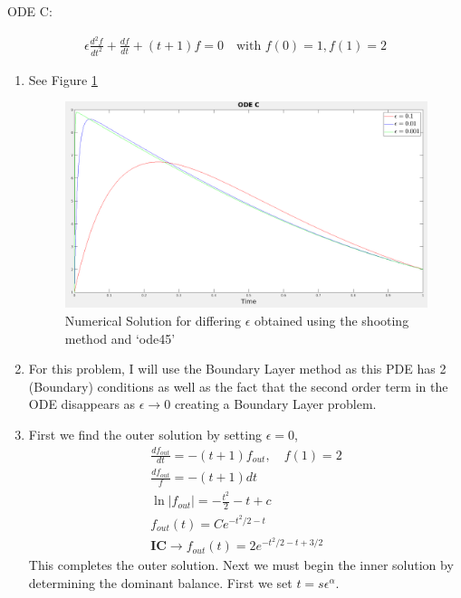 \documentclass{article}
\begin{document}
\vspace{20pt}

ODE C: 

\begin{gather*}
    \epsilon\frac{d^2f}{dt^2} + \frac{df}{dt} + (t+1)f = 0 \quad
    \text{with } f(0) = 1, f(1) = 2
\end{gather*}

\begin{enumerate}[label=\alph*.]
    \item See Figure \ref{fig:ODEC_num_sol}
        \begin{figure}[ht]
            \centering
            \includegraphics[width=.8\textwidth]{images/ODEC.png}
            \caption{Numerical Solution for differing $\epsilon$ obtained using
            the shooting method and `ode45'}
            \label{fig:ODEC_num_sol}
        \end{figure}
    \item For this problem, I will use the Boundary Layer method as this PDE has
    2 (Boundary) conditions as well as the fact that the second order term in
    the ODE disappears as $\epsilon \to 0$ creating a Boundary Layer problem.
    \item First we find the outer solution by setting $\epsilon = 0$, 
    \begin{gather*}
        \frac{df_{out}}{dt} = - (t+1)f_{out}, \quad f(1) = 2\\
        \frac{df_{out}}{f} = - (t+1)dt\\
        \ln|f_{out}| = -\frac{t^2}{2} - t + c\\
        f_{out}(t) = Ce^{-t^2/2 - t}\\
        \textbf{IC} \to f_{out}(t) = 2e^{-t^2/2 - t + 3/2}
    \end{gather*}
    This completes the outer solution. Next we must begin the inner solution by
    determining the dominant balance. First we set $t = s\epsilon^{\alpha}$. 


\end{enumerate}
\end{document}
